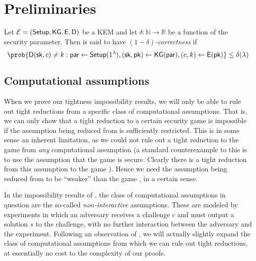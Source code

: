 
\section{Preliminaries}


\begin{definition}\label{def:corr}
  Let \(\mathcal{E} = (\mathsf{Setup}, \mathsf{KG}, \mathsf{E}, \mathsf{D})\) be a KEM
  and let \(\delta : \mathbb{N} \to \mathbb{R}\) be a function of the security parameter.
  Then \KEM is said to have \emph{\((1-\delta)\)-correctness} if
  \begin{equation}
    \prob{\Decaps{}(\sk,c) \ne k : \params \assign \Setup{}(1^{\lambda}), (\sk,\pk) \assign \KG{}(\params), (c,k) \assign \Encaps{}(\pk)} \le \delta (\lambda)
  \end{equation}
\end{definition}

\subsection{Computational assumptions}

When we prove our tightness impossibility results,
we will only be able to rule out tight reductions from a specific class of computational assumptions.
That is, we can only show that a tight reduction to a certain security game \gameG is impossible
if the assumption being reduced from is sufficiently restricted.
This is in some sense an inherent limitation, as we could not rule out a tight reduction to the game \gameG
from \emph{any} computational assumption
(a standard counterexample to this is to use the assumption that the game \gameG is secure.
Clearly there is a tight reduction from this assumption to the game \gameG).
Hence we need the assumption being reduced from to be ``weaker''
than the game \gameG, in a certain sense.

In the impossibility results of , the class of computational assumptions
in question are the so-called \emph{non-interactive} assumptions.
These are modeled by experiments in which an adversary receives a challenge \(c\)
and must output a solution \(s\) to the challenge, with no further interaction between the adversary and the experiment.
Following an observation of , we will actually slightly expand the class of computational assumptions
from which we can rule out tight reductions, at essentially no cost to the complexity of our proofs.

